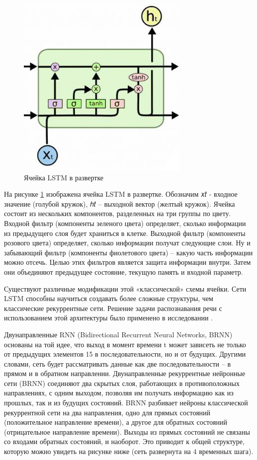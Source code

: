 \begin{itemize}
\begin{itemize}
\begin{figure}[h]
\includegraphics[width=0.75\columnwidth]{./img/recur_3.jpg}
\centering
\caption{Ячейка LSTM в развертке}
\label{pic:recur_3}
\end{figure}

На рисунке \ref{pic:recur_3} изображена ячейка LSTM в развертке. Обозначим 𝑥𝑡 - входное значение (голубой кружок), 
ℎ𝑡 – выходной вектор (желтый кружок). Ячейка состоит из нескольких компонентов, разделенных на три группы по цвету. 
Входной фильтр (компоненты зеленого цвета) определяет, сколько информации из предыдущего слоя будет храниться в клетке. 
Выходной фильтр (компоненты розового цвета) определяет, сколько информации получат следующие слои. 
Ну и забывающий фильтр (компоненты фиолетового цвета) – какую часть информации можно отсечь. 
Целью этих фильтров является защита информации внутри. 
Затем они объединяют предыдущее состояние, текущую память и входной параметр. 

Существуют различные модификации этой «классической» схемы ячейки. 
Сети LSTM способны научиться создавать более сложные структуры, чем классические рекуррентные сети. 
Решение задачи распознавания речи с использованием этой архитектуры было применено в исследовании \cite{2_recur}.

Двунаправленные RNN (Bidirectional Recurrent Neural Networks, BRNN) основаны на той идее, что выход в момент времени t может зависеть не только от предыдущих элементов
15 в последовательности, но и от будущих. Другими словами, сеть будет рассматривать данные как две последовательности – в прямом и в обратном направлении.
Двунаправленные рекуррентные нейронные сети (BRNN) соединяют два скрытых слоя, работающих в противоположных направлениях, 
с одним выходом, позволяя им получать информацию как из прошлых, так и из будущих состояний. 
BRNN разбивает нейроны классической рекуррентной сети на два направления, 
одно для прямых состояний (положительное направление времени), а другое для обратных состояний (отрицательное направление времени). 
Выходы из прямых состояний не связаны со входами обратных состояний, и наоборот. 
Это приводит к общей структуре, которую можно увидеть на рисунке ниже (сеть развернута на 4 временных шага).


\end{itemize}
\end{itemize}

